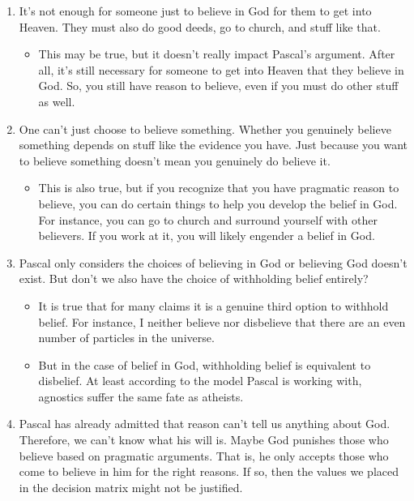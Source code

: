 \documentclass[letterpaper,10pt]{article}
\begin{document}
\begin{enumerate}
 \item It's not enough for someone just to believe in God for them to get into Heaven.  They must also do good deeds, go to church, and stuff like that.
 \begin{itemize}
  \item This may be true, but it doesn't really impact Pascal's argument.  After all, it's still necessary for someone to get into Heaven that they believe in God. So, you still have reason to believe, even if you must do other stuff as well.
 \end{itemize}
 \item One can't just choose to believe something.  Whether you genuinely believe something depends on stuff like the evidence you have. Just because you want to believe something doesn't mean you genuinely do believe it.
 \begin{itemize}
  \item This is also true, but if you recognize that you have pragmatic reason to believe, you can do certain things to help you develop the belief in God.  For instance, you can go to church and surround yourself with other believers.  If you work at it, you will likely engender a belief in God.
 \end{itemize}
 \item Pascal only considers the choices of believing in God or believing God doesn't exist. But don't we also have the choice of withholding belief entirely?
 \begin{itemize}
  \item It is true that for many claims it is a genuine third option to withhold belief. For instance, I neither believe nor disbelieve that there are an even number of particles in the universe.
  \item But in the case of belief in God, withholding belief is equivalent to disbelief.  At least according to the model Pascal is working with, agnostics suffer the same fate as atheists.
 \end{itemize}

 \item Pascal has already admitted that reason can't tell us anything about God.  Therefore, we can't know what his will is.  Maybe God punishes those who believe based on pragmatic arguments.  That is, he only accepts those who come to believe in him for the right reasons.  If so, then the values we placed in the decision matrix might not be justified.


\end{enumerate}
\end{document}
